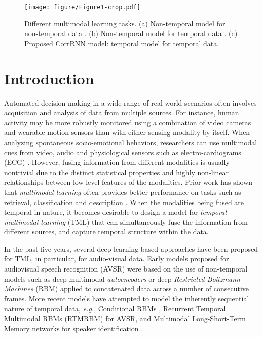 \documentclass[10pt,twocolumn,letterpaper]{article}
\begin{document}
\begin{figure}
\begin{center}
\texttt{[image: figure/Figure1-crop.pdf]}
\end{center}
\caption{Different multimodal learning tasks. (a) Non-temporal model for non-temporal data \cite{srivastava2012multimodal}. (b) Non-temporal model for temporal data \cite{ngiam2011multimodal}. (c) Proposed CorrRNN model: temporal model for temporal data.}
\label{fig:fig1}
\vspace{-1em}
\end{figure}

\section{Introduction}
\label{sec:intro}

Automated decision-making in a wide range of real-world scenarios often involves acquisition and analysis of data from multiple sources. For instance, human activity may be more robustly monitored using a combination of video cameras and wearable motion sensors than with either sensing modality by itself. When analyzing spontaneous socio-emotional behaviors, researchers can use multimodal cues from video, audio and physiological sensors such as electro-cardiograms (ECG) \cite{ringeval2015av+}. However, fusing information from different modalities is usually nontrivial due to the distinct statistical properties and highly non-linear relationships between low-level features \cite{srivastava2012multimodal} of the modalities. Prior work has shown that \textit{multimodal learning} often provides better performance on tasks such as retrieval, classification and description \cite{kiros2014multimodal,ngiam2011multimodal, srivastava2012multimodal,neverova2016moddrop}. When the modalities being fused are temporal in nature, it becomes desirable to design a model for \textit{temporal multimodal learning} (TML) that can simultaneously fuse the information from different sources, and capture temporal structure within the data.

In the past five years, several deep learning based approaches have been proposed for TML, in particular, for audio-visual data. Early models proposed for audiovisual speech recognition (AVSR) were based on the use of non-temporal models such as deep multimodal \textit{autoencoders} \cite{ngiam2011multimodal} or deep \textit{Restricted Boltzmann Machines} (RBM) \cite{srivastava2012multimodal,sui2015listening} applied to concatenated data across a number of consecutive frames. More recent models have attempted to model the inherently sequential nature of temporal data, \textit{e.g.}, Conditional RBMs \cite{amer2014multimodal}, Recurrent Temporal Multimodal RBMs (RTMRBM) \cite{hu2016temporal} for AVSR, and Multimodal Long-Short-Term Memory networks for speaker identification \cite{ren2016look}.
\end{document}
